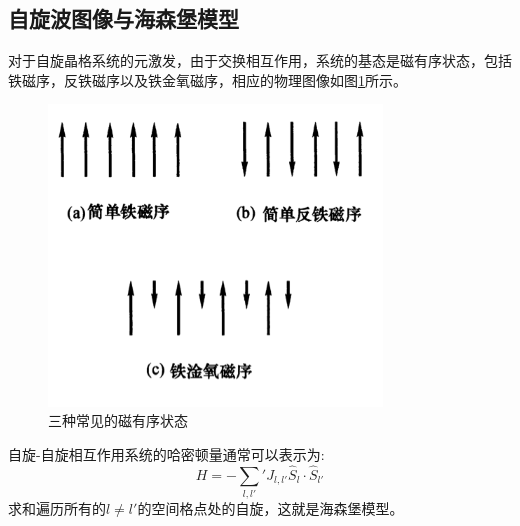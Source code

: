 \subsection{自旋波图像与海森堡模型}
对于自旋晶格系统的元激发，由于交换相互作用，系统的基态是磁有序状态，包括铁磁序，反铁磁序以及铁金氧磁序，相应的物理图像如图\ref{fig:ciyouxu}所示。
\begin{figure}
\begin{center}
\includegraphics[height=8cm]{figures/ciyouxu.png}
\caption{三种常见的磁有序状态}
\label{fig:ciyouxu}
\end{center}
\end{figure}
自旋-自旋相互作用系统的哈密顿量通常可以表示为:
\[H=-\sum_{l,l'}'J_{l,l'}\hat{S}_l\cdot \hat{S}_{l'}\]
求和遍历所有的$l\neq l'$的空间格点处的自旋，这就是海森堡模型。\par
